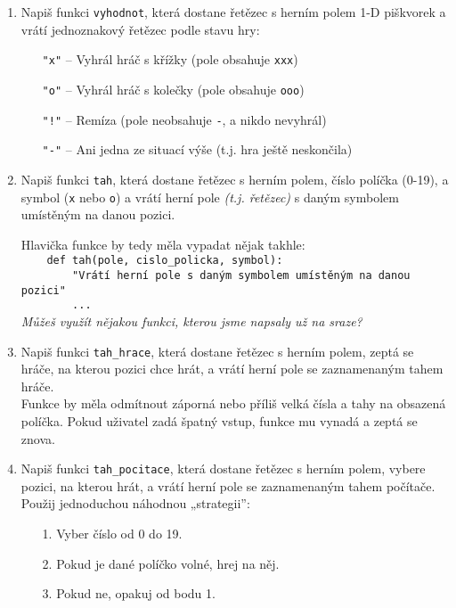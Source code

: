 \documentclass[a4paper,10pt]{article}
\begin{document}
\begin{enumerate}[resume]

\item Napiš funkci \texttt{vyhodnot}, která dostane řetězec
    s herním polem 1-D piškvorek
    a vrátí jednoznakový řetězec podle stavu hry:
    \begin{enumerate}
    \item[\texttt{"x"}] – Vyhrál hráč s křížky (pole obsahuje \texttt{xxx})
    \item[\texttt{"o"}] – Vyhrál hráč s kolečky (pole obsahuje \texttt{ooo})
    \item[\texttt{"!"}] – Remíza (pole neobsahuje \texttt{-}, a nikdo nevyhrál)
    \item[\texttt{"-"}] – Ani jedna ze situací výše (t.j. hra ještě neskončila)
    \end{enumerate}

\item Napiš funkci \texttt{tah}, která dostane řetězec s herním polem,
    číslo políčka (0-19), a symbol (\texttt{x} nebo \texttt{o})
    a vrátí herní pole \emph{(t.j. řetězec)} s daným symbolem umístěným na danou pozici.

    Hlavička funkce by tedy měla vypadat nějak takhle:
\\\verb+    def tah(pole, cislo_policka, symbol):+
\\\verb+        "Vrátí herní pole s daným symbolem umístěným na danou pozici"+
\\\verb+        ...+
    \\\emph{Můžeš využít nějakou funkci, kterou jsme napsaly už na sraze?}

\item Napiš funkci \texttt{tah\_hrace}, která dostane řetězec s herním polem,
    zeptá se hráče, na kterou pozici chce hrát, a vrátí herní pole
    se zaznamenaným tahem hráče.
    \\Funkce by měla odmítnout záporná nebo příliš velká čísla
    a tahy na obsazená políčka.
    Pokud uživatel zadá špatný vstup, funkce mu vynadá a zeptá se znova.

\item Napiš funkci \texttt{tah\_pocitace}, která dostane řetězec s herním polem,
    vybere pozici, na kterou hrát, a vrátí herní pole
    se zaznamenaným tahem počítače.
    \\Použij jednoduchou náhodnou „strategii”:
    \begin{enumerate}
    \item[1.] Vyber číslo od 0 do 19.
    \item[2.] Pokud je dané políčko volné, hrej na něj.
    \item[3.] Pokud ne, opakuj od bodu 1.
    \end{enumerate}


\end{enumerate}
\end{document}

